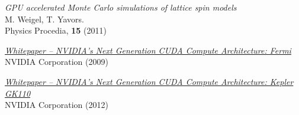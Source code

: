 \documentclass[paper=a4, fontsize=11pt]{scrartcl} %
\numberwithin{equation}{section} %
\numberwithin{figure}{section} %
\numberwithin{table}{section} %
\begin{document}
\begin{thebibliography}{100}
\textit{GPU accelerated Monte Carlo simulations of lattice spin models} \\
M. Weigel, T. Yavors. \\
Physics Procedia, \textbf{15} (2011)

\href{http://www.nvidia.com/content/pdf/fermi_white_papers/nvidia_fermi_compute_architecture_whitepaper.pdf}{\textit{Whitepaper -- NVIDIA's Next Generation CUDA Compute Architecture: Fermi}} \\
NVIDIA Corporation (2009)

\href{http://www.nvidia.com/content/pdf/kepler/NVIDIA-kepler-GK110-Architecture-Whitepaper.pdf}{\textit{Whitepaper -- NVIDIA's Next Generation CUDA Compute Architecture: Kepler GK110}} \\
NVIDIA Corporation (2012)


\end{thebibliography}
\end{document}
